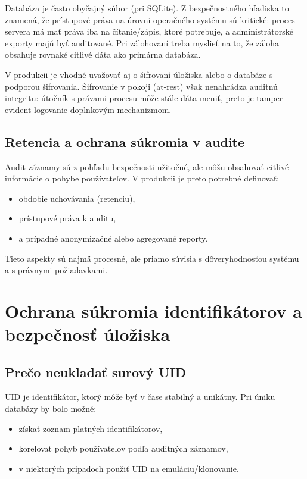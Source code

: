 \documentclass[journal,a4paper,onecolumn]{IEEEtran}
\begin{document}
Databáza je často obyčajný súbor (pri SQLite). Z bezpečnostného hľadiska to znamená, že prístupové práva na úrovni operačného systému sú kritické: proces servera má mať práva iba na čítanie/zápis, ktoré potrebuje, a administrátorské exporty majú byť auditované. Pri zálohovaní treba myslieť na to, že záloha obsahuje rovnaké citlivé dáta ako primárna databáza.

V produkcii je vhodné uvažovať aj o šifrovaní úložiska alebo o databáze s podporou šifrovania. Šifrovanie v pokoji (at-rest) však nenahrádza auditnú integritu: útočník s právami procesu môže stále dáta meniť, preto je tamper-evident logovanie doplnkovým mechanizmom.


\subsection{Retencia a ochrana súkromia v audite}

Audit záznamy sú z pohľadu bezpečnosti užitočné, ale môžu obsahovať citlivé informácie o pohybe používateľov. V produkcii je preto potrebné definovať:

\begin{itemize}[leftmargin=*,itemsep=2pt]
  \item obdobie uchovávania (retenciu),
  \item prístupové práva k auditu,
  \item a prípadné anonymizačné alebo agregované reporty.
\end{itemize}

Tieto aspekty sú najmä procesné, ale priamo súvisia s dôveryhodnosťou systému a s právnymi požiadavkami.

\section{Ochrana súkromia identifikátorov a bezpečnosť úložiska}

\subsection{Prečo neukladať surový UID}

UID je identifikátor, ktorý môže byť v čase stabilný a unikátny. Pri úniku databázy by bolo možné:

\begin{itemize}[leftmargin=*,itemsep=2pt]
  \item získať zoznam platných identifikátorov,
  \item korelovať pohyb používateľov podľa auditných záznamov,
  \item v niektorých prípadoch použiť UID na emuláciu/klonovanie.
\end{itemize}
\end{document}
